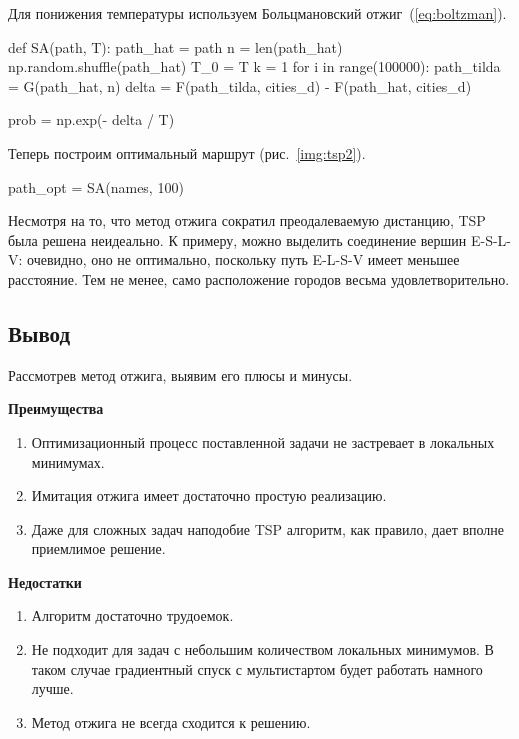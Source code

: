 Для понижения температуры используем Больцмановский отжиг~(\ref{eq:boltzman}).

\begin{pyin}
def SA(path, T):
  path_hat = path
  n = len(path_hat)
  np.random.shuffle(path_hat)
  T_0 = T
  k = 1
  for i in range(100000):
     path_tilda = G(path_hat, n)
     delta = F(path_tilda, cities_d) - F(path_hat, cities_d)
\end{pyin}

\begin{pyprint}
     prob = np.exp(- delta / T)
\end{pyprint}

Теперь построим оптимальный маршрут (рис.~\ref{img:tsp2}).

\begin{pyin}
path_opt = SA(names, 100)
\end{pyin}

Несмотря на то, что метод отжига сократил преодалеваемую дистанцию, TSP была решена неидеально. К примеру, можно выделить соединение вершин E-S-L-V: очевидно, оно не оптимально, поскольку путь E-L-S-V имеет меньшее расстояние. Тем не менее, само расположение городов весьма удовлетворительно.

\subsection{Вывод}

\noindent
Рассмотрев метод отжига, выявим его плюсы и минусы.

\noindent
\textbf{Преимущества}

\begin{enumerate}
	\item  Оптимизационный процесс поставленной задачи не застревает в локальных минимумах.

	\item Имитация отжига имеет достаточно простую реализацию.

	\item Даже для сложных задач наподобие TSP алгоритм, как правило, дает вполне приемлимое решение.
\end{enumerate}

\noindent
\textbf{Недостатки}

\begin{enumerate}
	\item Алгоритм достаточно трудоемок.

	\item Не подходит для задач с небольшим количеством локальных минимумов. В таком случае градиентный спуск с мультистартом будет работать намного лучше.

	\item Метод отжига не всегда сходится к решению.
\end{enumerate}


